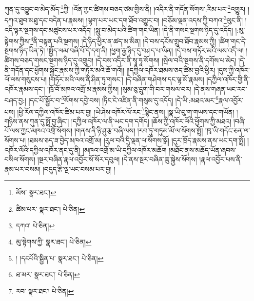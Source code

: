 ཀུན་དུ་འབྱུང་བ་མེད་མོད་\footnote{མོས་  སྣར་ཐང་། }ཀྱི། །འོན་ཀྱང་ཚིགས་བཅད་ཙམ་གྱིས་ནི། །འདིར་ནི་གདོན་སོགས་:རིམ་པར་\footnote{ཚིམ་པར་  སྣར་ཐང་།  པེ་ཅིན། }འགྱུར། །དཀའ་ཐུབ་མཐུ་དང་བདེན་པ་རྣམས། །ལྷག་པར་ཡང་དག་ཐོབ་འགྱུར་བ། །བཅོམ་ལྡན་འདས་ཀྱི་བཀའ་\footnote{དཀའ་  པེ་ཅིན། }ལུང་ནི། །འདི་ལྟར་སྔགས་དང་མཚུངས་པར་འདོད། །སླུ་བ་མེད་པའི་ཚིག་གང་ཡིན། །དེ་ནི་གསང་སྔགས་ཉིད་དུ་འདོད། །:མུ་སྟེགས་ཀྱིས་\footnote{མུ་སྟེགས་ཀྱི་  སྣར་ཐང་།  པེ་ཅིན། }ནི་བསྟན་པའི་སྔགས། །དེ་ཉིད་ཕྱིར་ན་ཚད་མ་མིན། །དེ་བས་དངོས་གྲུབ་ཐོབ་རྣམས་ཀྱི། །ཚིག་གང་དེ་སྔགས་ཉིད་ཡིན་ཏེ། །སྤྱོད་ལམ་བཞི་པོ་དེ་དག་ནི། །ཕྱག་རྒྱ་ཉིད་དུ་བཤད་པ་ཡིན། །དེ་བས་གཏོར་མའི་ལས་འདི་ལ། །ཚིགས་བཅད་གསང་སྔགས་ཉིད་དུ་འགྲུབ། །དེ་བས་འདིར་ནི་སྭཱ་ཧཱ་སོགས། །སྤེལ་བའི་སྔགས་ནི་དགོས་པ་མེད། །དེ་ནི་གདོན་དང་ཕྱོགས་སྐྱོང་རྣམས་ཀྱི་གཏོར་མའི་ཆོ་གའོ།། །།དཀྱིལ་འཁོར་ཐམས་ཅད་ཚིམ་བྱའི་ཕྱིར། །དུས་ཀྱི་འཁོར་ལོ་ལས་གསུངས་པ། །གཏོར་མའི་ལས་ནི་ཤིན་ཏུ་གསང་། །དེ་བཞིན་གཤེགས་དང་ལྷ་མོ་རྣམས། །དཀྱིལ་འཁོར་གྱི་ནི་འཁོར་རྣམས་དང་། །ཁྲོ་བོ་མཁའ་འགྲོ་མ་རྣམས་ཀྱིས། །སུམ་ཅུ་དྲུག་གི་བར་གསལ་བར། །དེ་ནས་གཞན་ཡང་རབ་བཤད་བྱ:། །དང་པོ་སྦྱོར་བ་\footnote{། །དངཔོའི་སྦྱིན་པ་  སྣར་ཐང་།  པེ་ཅིན། }སོགས་དབྱེ་བས། །ཏིང་ངེ་འཛིན་ནི་གསུམ་དུ་འདོད། །དེ་ཡི་:མཐའ་མར་\footnote{ཐ་མར་  སྣར་ཐང་།  པེ་ཅིན། }རྣལ་འབྱོར་པས། །ཕྱི་རོལ་དཀྱིལ་འཁོར་ཚིམ་པར་བྱ། །ཡེ་ཤེས་འཁོར་ལོ་རང་\footnote{རབ་  སྣར་ཐང་།  པེ་ཅིན། }སྙིང་ནས། །སྣ་ཡི་བུ་ག་གཡས་དང་གཡོན། །གཉིས་ནས་ཀུན་དུ་སྤྲོ་བྱ་ཞིང་། །དཀྱིལ་འཁོར་ལ་ནི་ཡང་དག་དགོད། །ཆོས་ཀྱི་འཁོར་ལོའི་ཕྱོགས་ཀྱི་མཐའ། །བཞི་པོ་ལས་ཀྱང་མཁའ་འགྲོ་སོགས། །གནས་ནི་ཉི་ཤུ་རྩ་བཞི་ལས། །རབ་ཏུ་གཏུམ་མོ་ལ་སོགས་སྤྲོ། །ཁྭ་ཡི་གདོང་ཅན་ལ་སོགས་པ། །ཐམས་ཅད་ཟ་བྱེད་མཁའ་འགྲོ་མ། །རུལ་བའི་དྲི་ལྡན་ལ་སོགས་སྒོ། །དུར་ཁྲོད་རྣམས་ནས་ཡང་དག་སྤྲོ། །འཁོར་ལོའི་དཀྱིལ་འཁོར་ནང་དུ་ནི། །མཁའ་འགྲོ་མ་ཡི་དཀྱིལ་འཁོར་མཆོག །མཐོང་ནས་མཆོད་ཡོན་ཞབས་བསིལ་སོགས། །སྔར་བཞིན་རྣལ་འབྱོར་སོ་སོར་དབུལ། །དེ་ནས་སྔར་བཞིན་ཆུ་སྐྱེས་སོགས། །རྣལ་འབྱོར་པས་ནི་རྣམ་པར་བསམ། །བདུད་རྩི་ལྔ་ཡང་བསམ་པར་བྱ། །
